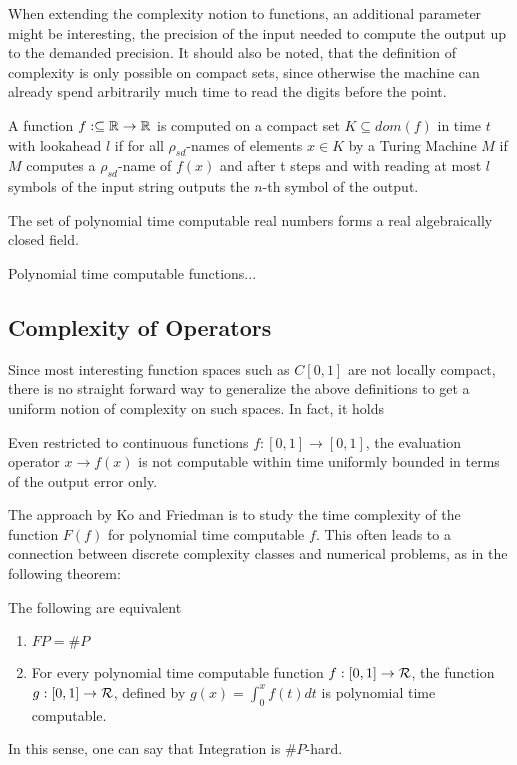 		When extending the complexity notion to functions, an additional parameter might be interesting, the precision of the input
		needed to compute the output up to the demanded precision.
		It should also be noted, that the definition of complexity is only possible on compact sets, since otherwise the machine can already
		spend arbitrarily much time to read the digits before the point.
		\begin{definition}
			A function $f: \subseteq \mathbb R \to \mathbb R$ is computed on a compact set $K \subseteq dom(f)$ in time $t$ with lookahead $l$ if for all $\rho_{sd}$-names of elements $ x \in K$ by a Turing Machine $M$ if $M$ computes a $\rho_{sd}$-name of $f(x)$ and after t steps and with reading at most $l$ symbols of the input string outputs the $n$-th symbol of the output.   
		\end{definition} 
		\begin{theorem}
			The set of polynomial time computable real numbers forms a real algebraically closed field.
		\end{theorem}
		\begin{example}
		Polynomial time computable functions...
		\end{example}
	\subsection{Complexity of Operators}
		Since most interesting function spaces such as $C[0,1]$ are not locally compact,
		there is no straight forward way to generalize the above definitions to get a uniform notion of complexity on such spaces.
		In fact, it holds
		\begin{theorem}
			Even restricted to continuous functions $f: [0,1] \to [0,1]$, the evaluation operator $x \to f(x)$ is not computable within time uniformly bounded in terms of the output error only.
		\end{theorem}
		The approach by Ko and Friedman \cite{KoBook} is to study the time complexity of the function $F(f)$ for polynomial time computable $f$.
		This  often leads to a connection between discrete complexity classes and numerical problems, as in the following theorem:
		\begin{theorem}
			The following are equivalent
			\begin{enumerate}
				\item $FP = \#P$
				\item For every polynomial time computable function $f: [0,1] \to \mathcal R$, the function
					$g: [0,1] \to \mathcal R$, defined by $g(x) = \int_0^x f(t) dt$ is polynomial time computable.
			\end{enumerate} 
		\end{theorem}
		In this sense, one can say that Integration is $\#P$-hard.

